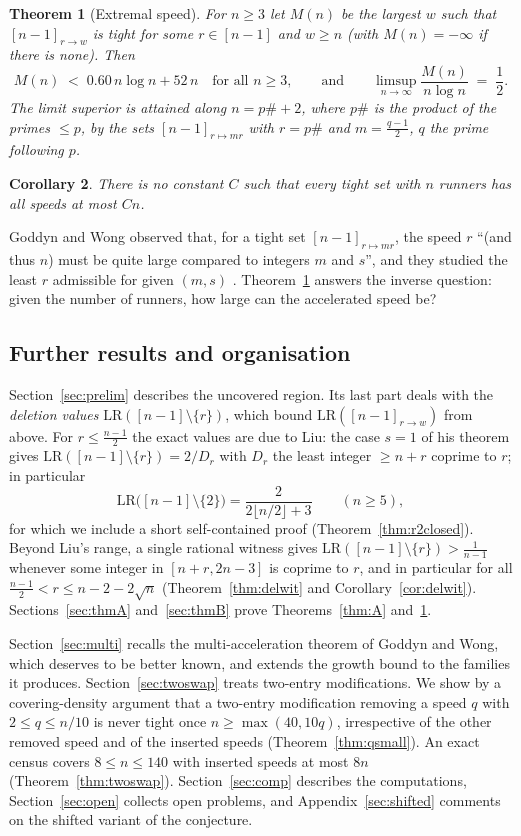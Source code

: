 \documentclass[11pt]{article}
\newtheorem{theorem}{Theorem}[section]
\newtheorem{corollary}[theorem]{Corollary}
\theoremstyle{definition}
\newcommand{\LR}{\mathrm{LR}}
\begin{document}
\begin{theorem}[Extremal speed]\label{thm:B}
For $n\ge3$ let $M(n)$ be the largest $w$ such that $[n-1]_{r\to w}$ is
tight for some $r\in[n-1]$ and $w\ge n$ (with $M(n)=-\infty$ if there
is none). Then
\[
M(n)\;<\;0.60\,n\log n+52\,n\quad\text{for all }n\ge3,
\qquad\text{and}\qquad
\limsup_{n\to\infty}\frac{M(n)}{n\log n}\;=\;\frac12 .
\]
The limit superior is attained along $n=p\#+2$, where $p\#$ is the
product of the primes $\le p$, by the sets $[n-1]_{r\mapsto mr}$ with
$r=p\#$ and $m=\frac{q-1}{2}$, $q$ the prime following $p$.
\end{theorem}

\begin{corollary}\label{cor:B}
There is no constant $C$ such that every tight set with $n$ runners has
all speeds at most $Cn$.
\end{corollary}

Goddyn and Wong observed that, for a tight set $[n-1]_{r\mapsto mr}$,
the speed $r$ ``(and thus $n$) must be quite large compared to integers
$m$ and $s$'', and they studied the least $r$ admissible for given
$(m,s)$ \cite[Sec.~4]{GoddynWong2006}.
Theorem~\ref{thm:B} answers the inverse question: given the number of
runners, how large can the accelerated speed be?

\subsection{Further results and organisation}

Section~\ref{sec:prelim} describes the uncovered region. Its last part
deals with the \emph{deletion values} $\LR([n-1]\setminus\{r\})$, which
bound $\LR([n-1]_{r\to w})$ from above. For $r\le\frac{n-1}2$ the exact
values are due to Liu: the case $s=1$ of his theorem
\cite[Thm.~18]{Liu2008} gives
$\LR([n-1]\setminus\{r\})=2/D_r$ with $D_r$ the least integer $\ge n+r$
coprime to $r$; in particular
\[
\LR\bigl([n-1]\setminus\{2\}\bigr)=\frac{2}{2\lfloor n/2\rfloor+3}
\qquad(n\ge5),
\]
for which we include a short self-contained proof
(Theorem~\ref{thm:r2closed}). Beyond Liu's range, a single rational
witness gives $\LR([n-1]\setminus\{r\})>\frac1{n-1}$ whenever some
integer in $[n+r,2n-3]$ is coprime to $r$, and in particular for all
$\frac{n-1}2<r\le n-2-2\sqrt n$ (Theorem~\ref{thm:delwit} and
Corollary~\ref{cor:delwit}). Sections~\ref{sec:thmA}
and~\ref{sec:thmB} prove Theorems~\ref{thm:A} and~\ref{thm:B}.

Section~\ref{sec:multi} recalls the multi-acceleration theorem of
Goddyn and Wong, which deserves to be better known, and extends the
growth bound to the families it produces. Section~\ref{sec:twoswap}
treats two-entry modifications. We show by a covering-density argument
that a two-entry modification removing a speed $q$ with
$2\le q\le n/10$ is never tight once $n\ge\max(40,10q)$, irrespective of
the other removed speed and of the inserted speeds
(Theorem~\ref{thm:qsmall}). An exact census covers $8\le n\le140$ with
inserted speeds at most $8n$ (Theorem~\ref{thm:twoswap}).
Section~\ref{sec:comp} describes the computations,
Section~\ref{sec:open} collects open problems, and
Appendix~\ref{sec:shifted} comments on the shifted variant of the
conjecture.
\end{document}
